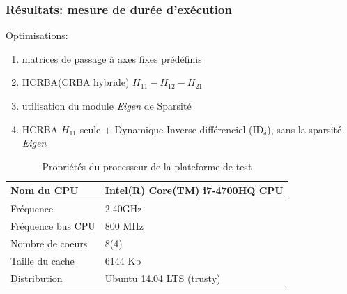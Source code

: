 \documentclass[10pt]{beamer}
\begin{document}
\begin{frame}\scriptsize
  \frametitle{Résultats: mesure de durée d'exécution}

  Optimisations:
	\begin{enumerate}
	\item matrices de passage à axes fixes prédéfinis
	\item HCRBA(CRBA hybride) $H_{11}-H_{12}-H_{21}$
	\item utilisation du module \emph{Eigen} de Sparsité
	\item HCRBA $H_{11}$ seule + Dynamique Inverse différenciel ($\mathrm{ID}_\delta$), sans la sparsité \emph{Eigen}
	\end{enumerate}
	
	
	\begin{flushleft}
	
	\begin{table}[H]
	\begin{center}
	\begin{tabular}[H]{|l|l|}
	\hline
	Nom du CPU & Intel(R) Core(TM) i7-4700HQ CPU \\ \hline \hline
	Fréquence & 2.40GHz \\ \hline
	Fréquence bus CPU & 800 MHz \\ \hline
	Nombre de coeurs & 8(4) \\ \hline
	Taille du cache & 6144 Kb \\ \hline
	Distribution & Ubuntu 14.04 LTS (trusty) \\
	\hline
	\end{tabular}
	\caption[Table caption text]{Propriétés du processeur de la plateforme de test}
	\label{table:propriétésProc}
	\end{center}
	\end{table}
	
	\end{flushleft}
	
\end{frame}
\end{document}
